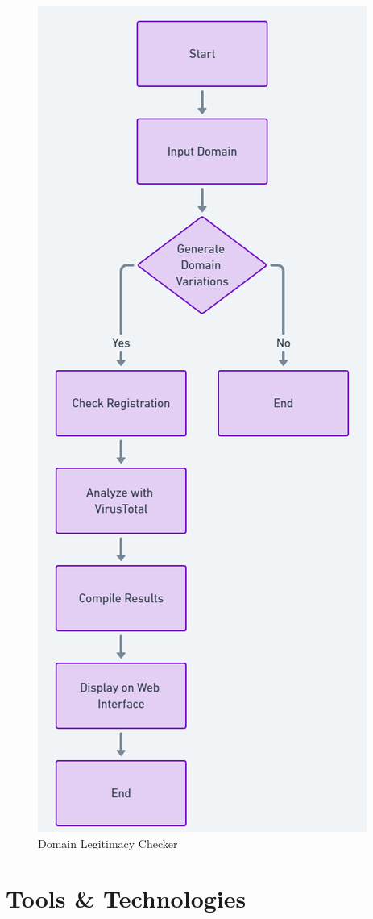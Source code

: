\begin{figure}[H]
    \centering
    \includegraphics[width=0.6\linewidth]{project/DNS Abuse Inspector Operational Flowchart.png}
    \caption{Domain Legitimacy Checker}
    \label{fig:figfigfig}
\end{figure}
\newpage


\section{Tools \& Technologies}

